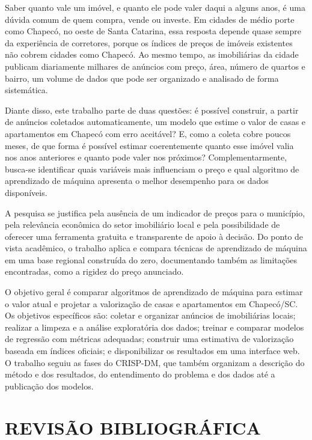 \documentclass[
  article,
  a4paper,
  12pt,
  fleqn,
  oneside,
  chapter = TITLE,
  section = TITLE,
]{abntex2}
\begin{document}
Saber quanto vale um imóvel, e quanto ele pode valer daqui a alguns anos, é uma dúvida comum de quem compra, vende ou investe. Em cidades de médio porte como Chapecó, no oeste de Santa Catarina, essa resposta depende quase sempre da experiência de corretores, porque os índices de preços de imóveis existentes não cobrem cidades como Chapecó. Ao mesmo tempo, as imobiliárias da cidade publicam diariamente milhares de anúncios com preço, área, número de quartos e bairro, um volume de dados que pode ser organizado e analisado de forma sistemática.

Diante disso, este trabalho parte de duas questões: é possível construir, a partir de anúncios coletados automaticamente, um modelo que estime o valor de casas e apartamentos em Chapecó com erro aceitável? E, como a coleta cobre poucos meses, de que forma é possível estimar coerentemente quanto esse imóvel valia nos anos anteriores e quanto pode valer nos próximos? Complementarmente, busca-se identificar quais variáveis mais influenciam o preço e qual algoritmo de aprendizado de máquina apresenta o melhor desempenho para os dados disponíveis.

A pesquisa se justifica pela ausência de um indicador de preços para o município, pela relevância econômica do setor imobiliário local e pela possibilidade de oferecer uma ferramenta gratuita e transparente de apoio à decisão. Do ponto de vista acadêmico, o trabalho aplica e compara técnicas de aprendizado de máquina em uma base regional construída do zero, documentando também as limitações encontradas, como a rigidez do preço anunciado.

O objetivo geral é comparar algoritmos de aprendizado de máquina para estimar o valor atual e projetar a valorização de casas e apartamentos em Chapecó/SC. Os objetivos específicos são: coletar e organizar anúncios de imobiliárias locais; realizar a limpeza e a análise exploratória dos dados; treinar e comparar modelos de regressão com métricas adequadas; construir uma estimativa de valorização baseada em índices oficiais; e disponibilizar os resultados em uma interface web. O trabalho seguiu as fases do CRISP-DM, que também organizam a descrição do método e dos resultados, do entendimento do problema e dos dados até a publicação dos modelos.

\section{REVISÃO BIBLIOGRÁFICA}\label{sec:revisao}
\end{document}
